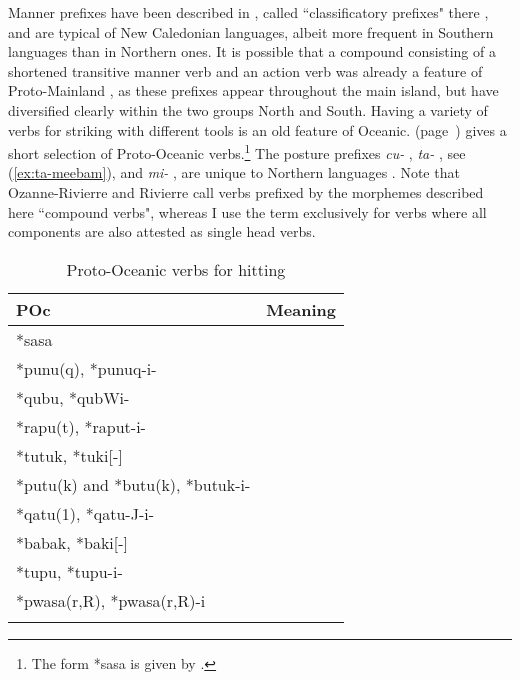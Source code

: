 \begin{enumerate}
\end{enumerate} Manner prefixes have been described in , called ``classificatory prefixes" there \parencite[349]{ozanne-rivierre_verbal_2004}, and are typical of New Caledonian languages, albeit more frequent in Southern languages than in Northern ones. It is possible that a compound consisting of a shortened transitive manner verb and an action verb was already a feature of Proto-Mainland \parencite[354]{ozanne-rivierre_verbal_2004}, as these prefixes appear throughout the main island, but have diversified clearly within the two groups North and South. Having a variety of verbs for striking with different tools is an old feature of Oceanic.  (page~\pageref{tab:POcV}) gives a short selection of Proto-Oceanic verbs.\footnote{The form *sasa is given by \parencite{grace_proto-oceanic_1969}.} The posture prefixes \textit{cu-} , \textit{ta-} , see (\ref{ex:ta-meebam}), and \textit{mi-} , are unique to Northern languages \parencite[356]{ozanne-rivierre_verbal_2004}. Note that Ozanne-Rivierre and Rivierre call verbs prefixed by the morphemes described here ``compound verbs", whereas I use the term exclusively for verbs where all components are also attested as single head verbs.

\begin{table}[p]
	\caption{Proto-Oceanic verbs for hitting \parencite[267]{ross_lexicon_1998}}
	\begin{tabularx}{\textwidth}{lQ}
	\lsptoprule
		 POc & Meaning\\\midrule
		 *sasa &\\
		  *punu(q), *punuq-i-& \\
		  *qubu, *qubWi-& \\
		  *rapu(t), *raput-i- & \\
		  *tutuk, *tuki[-]& \\
		  *putu(k) and *butu(k), *butuk-i-& \\
		  *qatu(1), *qatu-J-i- & \\
		  *babak, *baki[-]  & \\
		  *tupu, *tupu-i-& \\
		  *pwasa(r,R), *pwasa(r,R)-i­& \\
	  \lspbottomrule
	\end{tabularx}
\label{tab:POcV}
\end{table}
 

